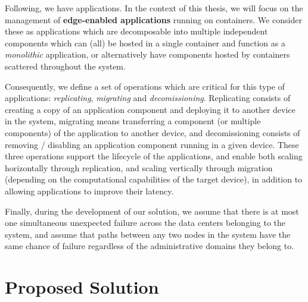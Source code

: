 Following, we have applications. In the context of this thesis, we will focus on the management of \textbf{edge-enabled applications} running on containers. We consider these as applications which are decomposable into multiple independent components which can (all) be hosted in a single container and function as a \textit{monolithic} application, or alternatively have components hosted by containers scattered throughout the system.

Consequently, we define a set of operations which are critical for this type of applications: \textit{replicating}, \textit{migrating} and \textit{decomissioning}. Replicating consists of creating a copy of an application component and deploying it to another device in the system, migrating means transferring a component (or multiple components) of the application to another device, and decomissioning consists of removing / disabling an application component running in a given device. These three operations support the lifecycle of the applications, and enable both scaling horizontally through replication, and scaling vertically through migration (depending on the computational capabilities of the target device), in addition to allowing applications to improve their latency. 

Finally, during the development of our solution, we assume that there is at most one simultaneous unexpected failure across the data centers belonging to the system, and assume that paths between any two nodes in the system have the same chance of failure regardless of the administrative domains they belong to.

\section{Proposed Solution}
\label{cha:proposed_sol}


